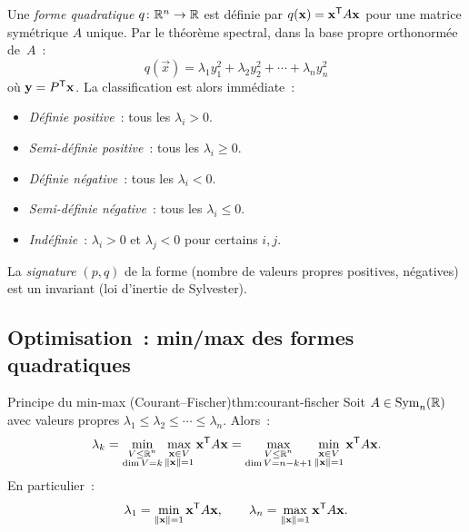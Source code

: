 Une \emph{forme quadratique}
$q \colon {\mathbb{R}}^n \to {\mathbb{R}}$ est définie par
$q(\mathbf{x}) = {\mathbf{x}}^{\mathsf{T}} A \mathbf{x}$ pour une matrice symétrique
$A$ unique. Par le théorème spectral, dans la base propre orthonormée de~$A$~:
\[
  q(\vec{x}) = \lambda_1 y_1^2 + \lambda_2 y_2^2 + \cdots + \lambda_n y_n^2
\]
où $\mathbf{y} = {P}^{\mathsf{T}}\mathbf{x}$. La classification est alors immédiate~:
\begin{itemize}
  \item \emph{Définie positive}~: tous les $\lambda_i > 0$.
  \item \emph{Semi-définie positive}~: tous les $\lambda_i \geq 0$.
  \item \emph{Définie négative}~: tous les $\lambda_i < 0$.
  \item \emph{Semi-définie négative}~: tous les $\lambda_i \leq 0$.
  \item \emph{Indéfinie}~: $\lambda_i > 0$ et $\lambda_j < 0$ pour
    certains $i, j$.
\end{itemize}
La \emph{signature}
$(p, q)$ de la forme (nombre de valeurs propres positives, négatives)
est un invariant (loi d'inertie de Sylvester).

\subsection{Optimisation~: min/max des formes quadratiques}%
\label{subsec:minmax}

\begin{theorem}{Principe du min-max (Courant--Fischer)}{thm:courant-fischer}
  Soit $A \in \operatorname{Sym}_n({\mathbb{R}})$ avec valeurs propres
  $\lambda_1 \leq \lambda_2 \leq \cdots \leq \lambda_n$.
  Alors~:
  \[
    \lambda_k = \min_{\substack{V \leq {\mathbb{R}}^n \\ \dim V = k}}
    \max_{\substack{\mathbf{x} \in V \\ \lVert\mathbf{x}\rVert = 1}}
    {\mathbf{x}}^{\mathsf{T}} A \mathbf{x}
    = \max_{\substack{V \leq {\mathbb{R}}^n \\ \dim V = n-k+1}}
    \min_{\substack{\mathbf{x} \in V \\ \lVert\mathbf{x}\rVert = 1}}
    {\mathbf{x}}^{\mathsf{T}} A \mathbf{x}.
  \]
  En particulier~:
  \[
    \lambda_1 = \min_{\lVert\mathbf{x}\rVert=1} {\mathbf{x}}^{\mathsf{T}} A \mathbf{x},
    \qquad
    \lambda_n = \max_{\lVert\mathbf{x}\rVert=1} {\mathbf{x}}^{\mathsf{T}} A \mathbf{x}.
  \]
\end{theorem}


